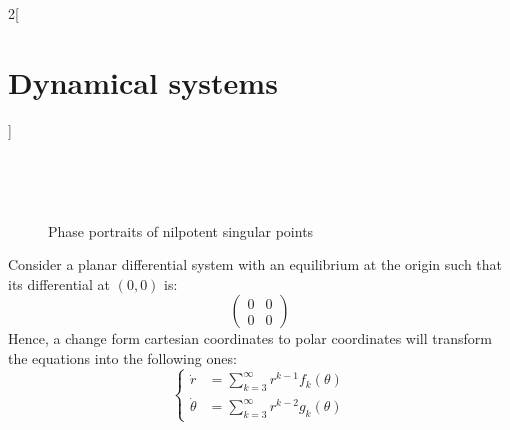 \documentclass[../../../main_math.tex]{subfiles}
\begin{document}
\begin{multicols}{2}[\section{Dynamical systems}]
\begin{theorem}
\begin{figure}[H]
\begin{subfigure}[b]{0.3\linewidth}
        \caption{}
        \label{DS_nilpot-h}
      \end{subfigure}
      \hfill
      \begin{subfigure}[b]{0.3\linewidth}
        \centering
        
        \caption{}
        \label{DS_nilpot-i}
      \end{subfigure}\\
      \begin{subfigure}[b]{0.3\linewidth}
        \centering
        
        \caption{}
        \label{DS_nilpot-j}
      \end{subfigure}
      \hfill
      \begin{subfigure}[b]{0.3\linewidth}
        \centering
        
        \caption{}
        \label{DS_nilpot-k}
      \end{subfigure}
      \hfill
      \begin{subfigure}[b]{0.3\linewidth}
        \centering
        
        \caption{}
        \label{DS_nilpot-l}
      \end{subfigure}\\
      \begin{subfigure}[b]{0.3\linewidth}
        \centering
        
        \caption{}
        \label{DS_nilpot-m}
      \end{subfigure}
      \caption{Phase portraits of nilpotent singular points}
    \end{figure}
  \end{theorem}
  \begin{theorem}\label{DS_blowpolar}
    Consider a planar differential system with an equilibrium at the origin such that its differential at $(0,0)$ is:
    $$\begin{pmatrix}
        0 & 0 \\
        0 & 0
      \end{pmatrix}$$
    Hence, a change form cartesian coordinates to polar coordinates will transform the equations into the following ones:
    $$
      \left\{
      \begin{aligned}
        \dot{r}      & = \sum_{k=3}^\infty r^{k-1}f_{k}(\theta) \\
        \dot{\theta} & = \sum_{k=3}^\infty r^{k-2}g_{k}(\theta)

\end{aligned}$$
\end{theorem}
\end{multicols}
\end{document}
